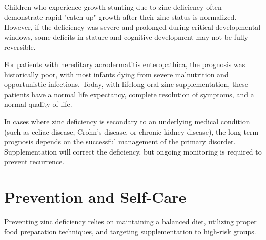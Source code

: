 Children who experience growth stunting due to zinc deficiency often demonstrate rapid "catch-up" growth after their zinc status is normalized. However, if the deficiency was severe and prolonged during critical developmental windows, some deficits in stature and cognitive development may not be fully reversible.

For patients with hereditary acrodermatitis enteropathica, the prognosis was historically poor, with most infants dying from severe malnutrition and opportunistic infections. Today, with lifelong oral zinc supplementation, these patients have a normal life expectancy, complete resolution of symptoms, and a normal quality of life.

In cases where zinc deficiency is secondary to an underlying medical condition (such as celiac disease, Crohn's disease, or chronic kidney disease), the long-term prognosis depends on the successful management of the primary disorder. Supplementation will correct the deficiency, but ongoing monitoring is required to prevent recurrence.

\section*{Prevention and Self-Care}
Preventing zinc deficiency relies on maintaining a balanced diet, utilizing proper food preparation techniques, and targeting supplementation to high-risk groups.

